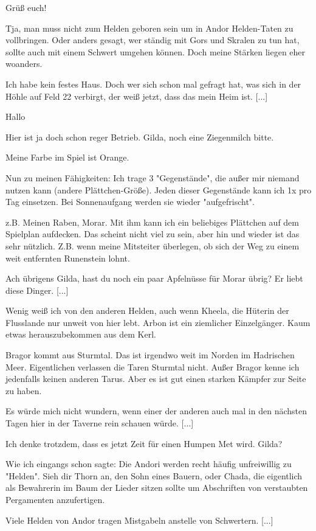\documentclass[10pt, a4paper, oneside]{book}
\begin{document}
\begin{multicols}{2}
Grüß euch!

Tja, man muss nicht zum Helden geboren sein um in Andor Helden-Taten zu vollbringen. Oder anders gesagt, wer ständig mit Gors und Skralen zu tun hat, sollte auch mit einem Schwert umgehen können. Doch meine Stärken liegen eher woanders.

Ich habe kein festes Haus. Doch wer sich schon mal gefragt hat, was sich in der Höhle auf Feld 22 verbirgt, der weiß jetzt, dass das mein Heim ist. [...]

Hallo

Hier ist ja doch schon reger Betrieb. Gilda, noch eine Ziegenmilch bitte.

Meine Farbe im Spiel ist Orange.

Nun zu meinen Fähigkeiten: Ich trage 3 "Gegenstände", die außer mir niemand nutzen kann (andere Plättchen-Größe). Jeden dieser Gegenstände kann ich 1x pro Tag einsetzen. Bei Sonnenaufgang werden sie wieder "aufgefrischt".

z.B. Meinen Raben, Morar. Mit ihm kann ich ein beliebiges Plättchen auf dem Spielplan aufdecken. Das scheint nicht viel zu sein, aber hin und wieder ist das sehr nützlich. Z.B. wenn meine Mitsteiter überlegen, ob sich der Weg zu einem weit entfernten Runenstein lohnt.

Ach übrigens Gilda, hast du noch ein paar Apfelnüsse für Morar übrig? Er liebt diese Dinger. [...]

Wenig weiß ich von den anderen Helden, auch wenn Kheela, die Hüterin der Flusslande nur unweit von hier lebt. Arbon ist ein ziemlicher Einzelgänger. Kaum etwas herauszubekommen aus dem Kerl.

Bragor kommt aus Sturmtal. Das ist irgendwo weit im Norden im Hadrischen Meer. Eigentlichen verlassen die Taren Sturmtal nicht. Außer Bragor kenne ich jedenfalls keinen anderen Tarus. Aber es ist gut einen starken Kämpfer zur Seite zu haben.

Es würde mich nicht wundern, wenn einer der anderen auch mal in den nächsten Tagen hier in der Taverne rein schauen würde. [...]

Ich denke trotzdem, dass es jetzt Zeit für einen Humpen Met wird. Gilda?

Wie ich eingangs schon sagte: Die Andori werden recht häufig unfreiwillig zu "Helden". Sieh dir Thorn an, den Sohn eines Bauern, oder Chada, die eigentlich als Bewahrerin im Baum der Lieder sitzen sollte um Abschriften von verstaubten Pergamenten anzufertigen.

Viele Helden von Andor tragen Mistgabeln anstelle von Schwertern. [...]


\end{multicols}
\end{document}

